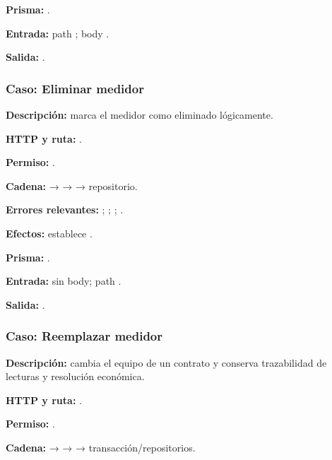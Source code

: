 \textbf{Prisma:} \texttt{}.  

\textbf{Entrada:} path \texttt{}; body \texttt{}.  

\textbf{Salida:} \texttt{}.


\subsubsection{Caso: Eliminar medidor}


\textbf{Descripción:} marca el medidor como eliminado lógicamente.  

\textbf{HTTP y ruta:} \texttt{}.  

\textbf{Permiso:} \texttt{}.  

\textbf{Cadena:} \texttt{} → \texttt{} → \texttt{} → repositorio.  

\textbf{Errores relevantes:} \texttt{}; \texttt{}; \texttt{}; \texttt{}.  

\textbf{Efectos:} establece \texttt{}.  

\textbf{Prisma:} \texttt{}.  

\textbf{Entrada:} sin body; path \texttt{}.  

\textbf{Salida:} \texttt{}.


\subsubsection{Caso: Reemplazar medidor}


\textbf{Descripción:} cambia el equipo de un contrato y conserva trazabilidad de lecturas y resolución económica.  

\textbf{HTTP y ruta:} \texttt{}.  

\textbf{Permiso:} \texttt{}.  

\textbf{Cadena:} \texttt{} → \texttt{} → \texttt{} → transacción/repositorios.  

